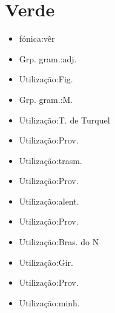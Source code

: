 \documentclass{article}
\begin{document}
\section{Verde}
\begin{itemize}
\item {fónica:vêr}
\end{itemize}
\begin{itemize}
\item {Grp. gram.:adj.}
\end{itemize}
\begin{itemize}
\item {Utilização:Fig.}
\end{itemize}
\begin{itemize}
\item {Grp. gram.:M.}
\end{itemize}
\begin{itemize}
\item {Utilização:T. de Turquel}
\end{itemize}
\begin{itemize}
\item {Utilização:Prov.}
\end{itemize}
\begin{itemize}
\item {Utilização:trasm.}
\end{itemize}
\begin{itemize}
\item {Utilização:Prov.}
\end{itemize}
\begin{itemize}
\item {Utilização:alent.}
\end{itemize}
\begin{itemize}
\item {Utilização:Prov.}
\end{itemize}
\begin{itemize}
\item {Utilização:Bras. do N}
\end{itemize}
\begin{itemize}
\item {Utilização:Gír.}
\end{itemize}
\begin{itemize}
\item {Utilização:Prov.}
\end{itemize}
\begin{itemize}
\item {Utilização:minh.}
\end{itemize}
\end{document}
